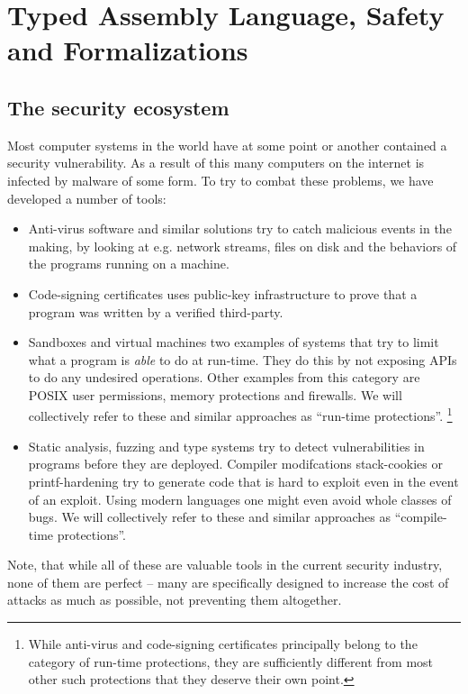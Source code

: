 \chapter{Typed Assembly Language, Safety and Formalizations}
\label{chap:introduction}

\section{The security ecosystem}

Most computer systems in the world have at some point or another contained a
security vulnerability. As a result of this many computers on the internet is
infected by malware of some form. To try to combat these problems, we have
developed a number of tools:

\begin{itemize}
\item Anti-virus software and similar solutions try to catch malicious events in
  the making, by looking at e.g. network streams, files on disk and the
  behaviors of the programs running on a machine.
\item Code-signing certificates uses public-key infrastructure to prove that a
  program was written by a verified third-party.
\item Sandboxes and virtual machines two examples of systems that try to limit
  what a program is \emph{able} to do at run-time. They do this by not exposing
  APIs to do any undesired operations. Other examples from this category are
  POSIX user permissions, memory protections and firewalls. We will collectively
  refer to these and similar approaches as ``run-time protections''.
  \footnote{
    While anti-virus and code-signing certificates principally belong to the
    category of run-time protections, they are sufficiently different from most
    other such protections that they deserve their own point.
  }
\item Static analysis, fuzzing and type systems try to detect vulnerabilities in
  programs before they are deployed. Compiler modifcations stack-cookies or
  printf-hardening try to generate code that is hard to exploit even in the
  event of an exploit. Using modern languages one might even avoid whole classes
  of bugs. We will collectively refer to these and similar approaches as
  ``compile-time protections''.
\end{itemize}

Note, that while all of these are valuable tools in the current security
industry, none of them are perfect -- many are specifically designed to increase
the cost of attacks as much as possible, not preventing them altogether.

